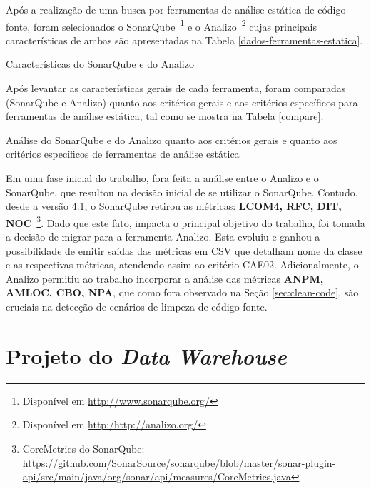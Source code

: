 Após a realização de uma busca por ferramentas de análise estática de código-fonte, foram selecionados o SonarQube~\footnote{Disponível em \url{http://www.sonarqube.org/}} e o Analizo~\footnote{Disponível em \url{http:/http://analizo.org/}} cujas principais características de ambas são apresentadas na Tabela \ref{dados-ferramentas-estatica}.

\begin{savenotes}
\begin{table}[!ht]
\centering

\caption{Características do SonarQube e do Analizo}
\label{dados-ferramentas-estatica}
\end{table}
\FloatBarrier
\end{savenotes}

Após levantar as características gerais de cada ferramenta, foram comparadas (SonarQube e Analizo) quanto aos critérios gerais e aos critérios específicos para ferramentas de análise estática, tal como se mostra na Tabela \ref{compare}.


\begin{table}[!ht]
\centering

\caption{Análise do SonarQube e do Analizo quanto aos critérios gerais e quanto aos critérios específicos de ferramentas de análise estática}
\label{compare}
\end{table}
\FloatBarrier

Em uma fase inicial do trabalho, fora feita a análise entre o Analizo e o SonarQube, que resultou na decisão inicial de se utilizar o SonarQube. Contudo, desde a versão 4.1, o SonarQube retirou as métricas: \textbf{LCOM4, RFC, DIT, NOC}~\footnote{CoreMetrics do SonarQube: \url{https://github.com/SonarSource/sonarqube/blob/master/sonar-plugin-api/src/main/java/org/sonar/api/measures/CoreMetrics.java}}. Dado que este fato, impacta o principal objetivo do trabalho, foi tomada a decisão de migrar para a ferramenta Analizo. Esta evoluiu e ganhou a possibilidade de emitir saídas das métricas em CSV que detalham nome da classe e as respectivas métricas, atendendo assim ao critério CAE02. Adicionalmente, o Analizo permitiu ao trabalho incorporar a análise das métricas \textbf{ANPM, AMLOC, CBO, NPA}, que como fora observado na Seção \ref{sec:clean-code}, são cruciais na detecção de cenários de limpeza de código-fonte.

\section{Projeto do \textit{Data Warehouse}}
\label{sec:project-dw}

